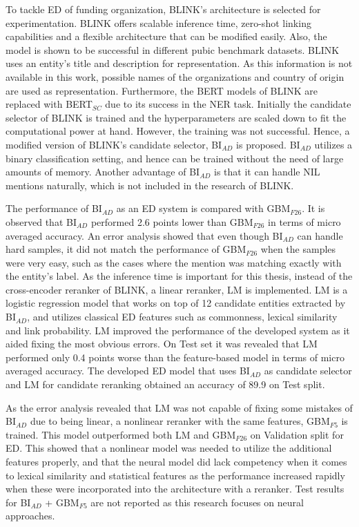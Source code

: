 \documentclass{report}
\theoremstyle{definition}
\theoremstyle{remark}
\begin{document}
To tackle ED of funding organization, BLINK's architecture is selected for experimentation. BLINK offers scalable inference time, zero-shot linking capabilities and a flexible architecture that can be modified easily. Also, the model is shown to be successful in different pubic benchmark datasets. BLINK uses an entity's title and description for representation. As this information is not available in this work, possible names of the organizations and country of origin are used as representation. Furthermore, the BERT models of BLINK are replaced with BERT$_{SC}$ due to its success in the NER task. Initially the candidate selector of BLINK is trained and the hyperparameters are scaled down to fit the computational power at hand. However, the training was not successful. Hence, a modified version of BLINK's candidate selector, BI$_{AD}$ is proposed. BI$_{AD}$ utilizes a binary classification setting, and hence can be trained without the need of large amounts of memory. Another advantage of BI$_{AD}$ is that it can handle NIL mentions naturally, which is not included in the research of BLINK.

The performance of BI$_{AD}$ as an ED system is compared with GBM$_{F26}$. It is observed that BI$_{AD}$ performed 2.6 points lower than GBM$_{F26}$ in terms of micro averaged accuracy. An error analysis showed that even though BI$_{AD}$ can handle hard samples, it did not match the performance of GBM$_{F26}$ when the samples were very easy, such as the cases where the mention was matching exactly with the entity's label. As the inference time is important for this thesis, instead of the cross-encoder reranker of BLINK, a linear reranker, LM is implemented. LM is a logistic regression model that works on top of 12 candidate entities extracted by BI$_{AD}$, and utilizes classical ED features such as commonness, lexical similarity and link probability. LM improved the performance of the developed system as it aided fixing the most obvious errors. On Test set it was revealed that LM performed only 0.4 points worse than the feature-based model in terms of micro averaged accuracy. The developed ED model that uses BI$_{AD}$ as candidate selector and LM for candidate reranking obtained an accuracy of 89.9 on Test split.

As the error analysis revealed that LM was not capable of fixing some mistakes of BI$_{AD}$ due to being linear, a nonlinear reranker with the same features, GBM$_{F5}$ is trained. This model outperformed both LM and GBM$_{F26}$ on Validation split for ED. This showed that a nonlinear model was needed to utilize the additional features properly, and that the neural model did lack competency when it comes to lexical similarity and statistical features as the performance increased rapidly when these were incorporated into the architecture with a reranker. Test results for BI$_{AD}$ + GBM$_{F5}$ are not reported as this research focuses on neural approaches.
\end{document}
